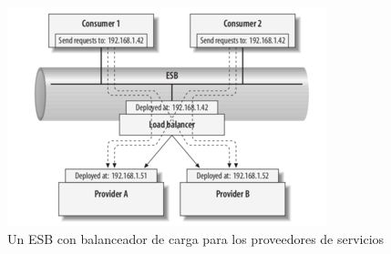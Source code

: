 \begin{figure}[H]
  \includegraphics[width=\linewidth]{src/images/02-capitulo-2/tecnologias/esb/esb-interceptors-load-balancer.png}
  \caption{Un ESB con balanceador de carga para los proveedores de servicios}
  \label{fig:esb-interceptors-load-balancer}
\end{figure}
